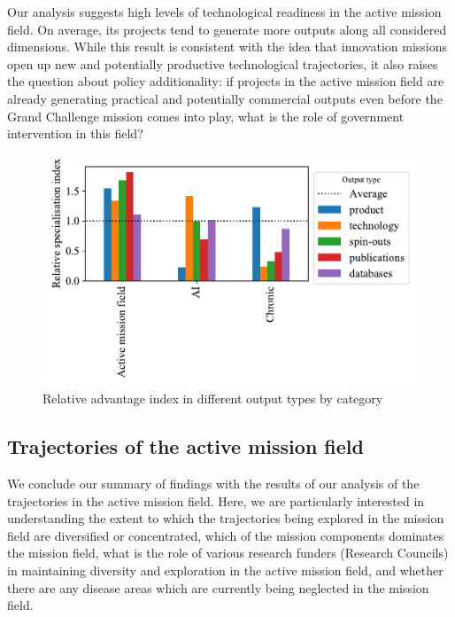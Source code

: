 \documentclass[11pt]{article}
\begin{document}
Our analysis suggests high levels of technological readiness in the active mission field. On average, its projects tend to generate more outputs along all considered dimensions. While this result is consistent with the idea that innovation missions  open up new and potentially productive technological trajectories, it also raises the question about policy additionality: if projects in the active mission field are already generating practical and potentially commercial outputs even before the Grand Challenge mission comes into play, what is the role of government intervention in this field?

\begin{figure}[!ht]
    \centering
    \includegraphics[width=\textwidth]{figures/fig_17_outputs.pdf}
    \caption{Relative advantage index in different output types by category}
    \label{fig:outputs}
\end{figure}

\subsection{Trajectories of the active mission field}
\label{subsec:trajectory}

We conclude our summary of findings with the results of our analysis of the trajectories in the active mission field. Here, we are particularly interested in understanding the extent to which the trajectories being explored in the mission field are diversified or concentrated, which of the mission components dominates the mission field, what is the role of various research funders (Research Councils) in maintaining diversity and exploration in the active mission field, and whether there are any disease areas which are currently being neglected in the mission field.
\end{document}
